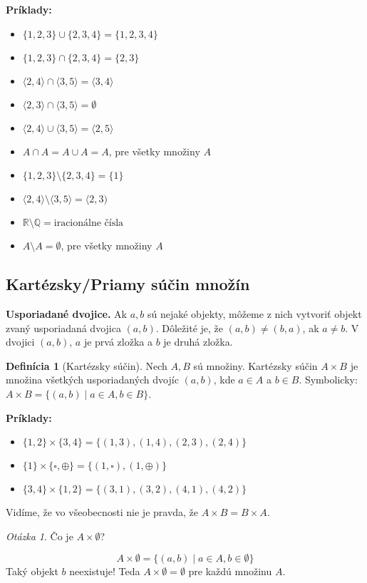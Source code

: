 \documentclass[12pt, a4paper]{article}
\theoremstyle{definition}
\newtheorem{definition}{Definícia}[section]
\theoremstyle{plain}
\theoremstyle{remark}
\newtheorem*{question}{Otázka}
\begin{document}
\noindent\textbf{Príklady:}
\begin{itemize}
    \item $\{1,2,3\} \cup \{2,3,4\} = \{1,2,3,4\}$
    \item $\{1,2,3\} \cap \{2,3,4\} = \{2,3\}$
    \item $\langle 2,4 \rangle \cap \langle 3,5 \rangle = \langle 3,4 \rangle$
    \item $\langle 2,3 \rangle \cap \langle 3,5 \rangle = \emptyset$
    \item $\langle 2,4 \rangle \cup \langle 3,5 \rangle = \langle 2,5 \rangle$
    \item $A \cap A = A \cup A = A$, pre všetky množiny $A$
    \item $\{1,2,3\} \setminus \{2,3,4\} = \{1\}$
    \item $\langle 2,4 \rangle \setminus \langle 3,5 \rangle = \langle 2,3)$
    \item $\mathbb{R} \setminus \mathbb{Q} = \text{iracionálne čísla}$
    \item $A \setminus A = \emptyset$, pre všetky množiny $A$
\end{itemize}

\subsection*{Kartézsky/Priamy súčin množín}
\textbf{Usporiadané dvojice.} Ak $a, b$ sú nejaké objekty, môžeme z nich vytvoriť objekt zvaný usporiadaná dvojica $(a, b)$. Dôležité je, že $(a,b) \neq (b,a)$, ak $a \neq b$.
V dvojici $(a,b)$, $a$ je prvá zložka a $b$ je druhá zložka.

\begin{definition}[Kartézsky súčin]
Nech $A, B$ sú množiny.
Kartézsky súčin $A \times B$ je množina všetkých usporiadaných dvojíc $(a, b)$, kde $a \in A$ a $b \in B$.
Symbolicky: $A \times B = \{(a,b) \mid a \in A, b \in B\}$.
\end{definition}

\noindent\textbf{Príklady:}
\begin{itemize}
    \item $\{1,2\} \times \{3,4\} = \{(1,3), (1,4), (2,3), (2,4)\}$
    \item $\{1\} \times \{\square, \oplus\} = \{(1,\square), (1,\oplus)\}$
    \item $\{3,4\} \times \{1,2\} = \{(3,1), (3,2), (4,1), (4,2)\}$
\end{itemize}
Vidíme, že vo všeobecnosti nie je pravda, že $A \times B = B \times A$.
\begin{question}
Čo je $A \times \emptyset$?
\end{question}
$$ A \times \emptyset = \{(a,b) \mid a \in A, b \in \emptyset\} $$
Taký objekt $b$ neexistuje!
Teda $A \times \emptyset = \emptyset$ pre každú množinu $A$.
\end{document}
